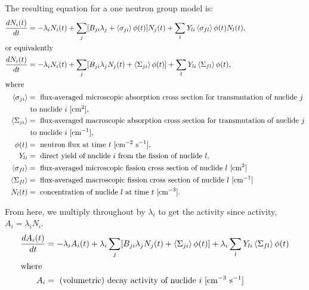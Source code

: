 \documentclass[letterpaper,11pt]{article}
\begin{document}
The resulting equation for a one neutron group model is:
%
\begin{align}
\frac{dN_i (t)}{dt} &= - \lambda_i N_i (t) + \sum_j [B_{ji} \lambda_j +
\left<\sigma_{ji}\right> \phi (t)] N_j (t) + \sum_l Y_{li} \left<\sigma_{fl}
\right> \phi (t) N_l (t), \\
\intertext{or equivalently}
\frac{dN_i (t)}{dt} &= - \lambda_i N_i (t) + \sum_j [B_{ji} \lambda_j N_j (t)
+ \left<\Sigma_{ji}\right> \phi (t)] + \sum_l Y_{li} \left<\Sigma_{fl}
\right> \phi (t), \\
\intertext{where}
\left< \sigma_{ji} \right> &= \text{ flux-averaged microscopic absorption
cross section for transmutation of nuclide $j$} \nonumber \\
& \text{ to nuclide $i$ [cm$^2$]}, \nonumber \\
\left< \Sigma_{ji} \right> &= \text{ flux-averaged macroscopic absorption
cross section for transmutation of nuclide $j$} \nonumber \\
&\text{ to nuclide $i$ [cm$^{-1}$]}, \nonumber \\
\phi (t) &= \text{ neutron flux at time $t$ [cm$^{-2}$ s$^{-1}$]}, \nonumber \\
Y_{li} &= \text{ direct yield of nuclide $i$ from the fission of nuclide $l$},
\nonumber \\
\left< \sigma_{fl} \right> &= \text{ flux-averaged microscopic fission
cross section of nuclide $l$ [cm$^2$]} \nonumber \\
\left< \Sigma_{fl} \right> &= \text{ flux-averaged macroscopic fission
cross section of nuclide $l$ [cm$^{-1}$]} \nonumber \\
N_l (t) &= \text{ concentration of nuclide $l$ at time $t$ [cm$^{-3}$]}. \nonumber
\end{align}

From here, we multiply throughout by $\lambda_i$ to get the activity since
activity, $A_i = \lambda_i N_i$.
%
\begin{align}
\frac{dA_i (t)}{dt} &= - \lambda_i A_i (t) + \lambda_i \sum_j [B_{ji}
\lambda_j N_j (t) + \left<\Sigma_{ji}\right> \phi (t)] + \lambda_i \sum_l
Y_{li} \left< \Sigma_{fl} \right> \phi (t) \\
\intertext{where}
A_i &=  \text{ (volumetric) decay activity of nuclide }i \text{ [cm$^{-3}$ s$^{-1}$]} \nonumber
\end{align}
\end{document}
